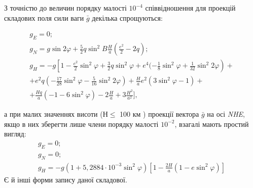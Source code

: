 З точністю до величин порядку малості $10^{-4}$ співвідношення для проекцій складових 
поля сили ваги $\bar{g}$ декілька спрощуються:

\[\begin{array}{l} 
{ g_{E} =0;} \\ 
{g_{N} =g\sin 2\varphi+\frac{5}{2} q\sin ^{2} B\frac{H}{a}(\frac{e^{2}}{2} -2q);} \\ 
{g_{H} =-g\left[1-\frac{e^{2}}{2}\sin ^{2} \varphi+\frac{3}{2} q\sin ^{2} \varphi+e^{4}(-\frac{1}{8} \sin ^{2} \varphi+\frac{1}{32} 
\sin ^{2} 2\varphi\right)+} \\ 
{ +e^{2} q\left(-\frac{17}{28} 
\sin ^{2} \varphi-\frac{5}{16} \sin ^{2} 2\varphi\right)+\frac{H}{a} e^{2} (3\sin ^{2} \varphi-1)+}\\ 
{ +\frac{Hq}{a} (-1-6\sin ^{2}\varphi)-2\frac{H}{a} +3\frac{H^{2}}{a^{2}}],} 
\end{array}\] 

а при малих значеннях висоти ($Н\leq$ 100 км ) проекції вектора  $\bar{g}$ на 
осі \textit{NHE}, якщо в них зберегти лише члени порядку малості $10^{-2}$, 
взагалі мають простий вигляд: 
\[\begin{array}{l} 
{g_{E} =0;}\\
{g_{N} =0;}\\ 
{g_{H} =-g(1+5,2884\cdot 10^{-3} \sin ^{2}\varphi)[1-\frac{2H}{a}
(1-e\sin^{2}\varphi )]} 
\end{array}\] 
Є й інші форми запису даної складової.

